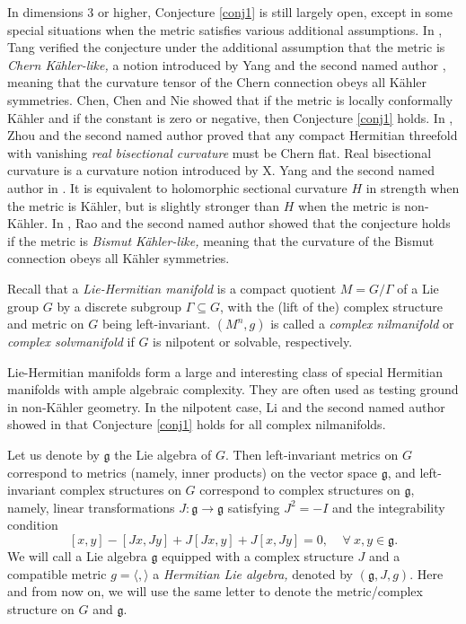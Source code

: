 \documentclass{amsart}
\begin{document}
In dimensions $3$ or higher, Conjecture \ref{conj1} is still largely open, except in some special situations when the metric satisfies various additional assumptions. In \cite{Tang}, Tang verified the conjecture under the additional assumption that the metric is {\em Chern K\"ahler-like,} a notion introduced by Yang and the second named author \cite{YangZ}, meaning that the curvature tensor of the Chern connection obeys all K\"ahler symmetries. Chen, Chen and Nie \cite{CCN} showed that if the metric is locally conformally K\"ahler and if the constant is zero or negative, then Conjecture \ref{conj1} holds. In \cite{ZhouZ}, Zhou and the second named author proved that any compact Hermitian threefold with vanishing {\em real bisectional curvature} must be Chern flat. Real bisectional curvature is a curvature notion introduced by X. Yang and the second named author in \cite{XYangZ}. It is equivalent to holomorphic sectional curvature $H$ in strength when the metric is K\"ahler, but is slightly stronger than $H$ when the metric is non-K\"ahler. In \cite{RZ}, Rao and the second named author showed that the conjecture holds if the metric is {\em Bismut K\"ahler-like,} meaning that the curvature of the Bismut connection obeys all K\"ahler symmetries. 

Recall that a {\em Lie-Hermitian manifold} is a  compact quotient $M=G/\Gamma$ of a Lie group $G$ by a discrete subgroup $\Gamma \subseteq G$, with the (lift of the) complex structure and metric on $G$ being left-invariant. $(M^n,g)$ is called a {\em complex nilmanifold} or {\em complex solvmanifold} if $G$ is nilpotent or solvable, respectively. 

Lie-Hermitian manifolds form a large and interesting class of special Hermitian manifolds with ample algebraic complexity. They are often used as testing ground in non-K\"ahler geometry. In the nilpotent case,  Li and the second named author showed in \cite{LZ} that Conjecture \ref{conj1} holds for all complex nilmanifolds. 

Let us denote by ${\mathfrak g}$ the Lie algebra of $G$. Then left-invariant metrics on $G$ correspond to metrics (namely, inner products) on the vector space ${\mathfrak g}$, and left-invariant complex structures on $G$ correspond to complex structures on ${\mathfrak g}$, namely, linear transformations $J:{\mathfrak g} \rightarrow {\mathfrak g}$ satisfying $J^2=-I$ and the integrability condition  
\begin{equation} \label{integrability}
[x,y] - [Jx,Jy] + J[Jx,y] + J[x,Jy] =0, \ \ \ \ \ \forall \ x,y \in {\mathfrak g}. 
\end{equation}
We will call a Lie algebra ${\mathfrak g}$ equipped with a complex structure $J$ and a compatible metric $g=\langle, \rangle$  a {\em Hermitian Lie algebra,} denoted by $({\mathfrak g}, J, g)$. Here and from now on, we will use the same letter to denote the metric/complex structure on $G$ and ${\mathfrak g}$.
\end{document}
